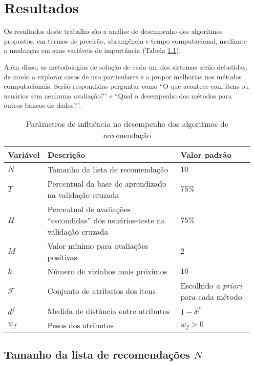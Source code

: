 \chapter[Resultados]{Resultados}
\label{chap:resultados}

Os resultados deste trabalho são a análise de desempenho dos algoritmos propostos, em termos de precisão, abrangência e tempo computacional, mediante a mudanças em suas variáveis de importância (Tabela \ref{tab:variaveis}). 

Além disso, as metodologias de solução de cada um dos sistemas serão debatidas, de modo a explorar casos de uso particulares e a propor melhorias nos métodos computacionais. Serão respondidas perguntas como ``O que acontece com itens ou usuários sem nenhuma avaliação?'' e ``Qual o desempenho dos métodos para outros bancos de dados?''.

\begin{table}[hp]
\begin{center}
    \caption{Parâmetros de influência no desempenho dos algoritmos de recomendação}
    \label{tab:variaveis}
    \begin{tabular}{  | p{2cm} | p{7cm} | p{3.5cm} | } 
    \hline
    \textbf{Variável} & \textbf{Descrição} & \textbf{Valor padrão}  \\ \hline
    $N$ & Tamanho da lista de recomendação & $10$ \\ \hline   
    $T$ & Percentual da base de aprendizado na validação cruzada & $75\%$ \\ \hline
    $H$ & Percentual de avaliações ``escondidas'' dos usuários-teste na validação cruzada & $75\%$ \\ \hline
    $M$ & Valor mínimo para avaliações positivas & $2$ \\ \hline
    $k$ & Número de vizinhos mais próximos & $10$ \\ \hline
    $\mathcal{F}$ & Conjunto de atributos dos itens & Escolhido \textit{a priori} para cada método \\ \hline
    $d^f$ & Medida de distância entre atributos & $1 - \delta^f$ \\ \hline
    $w_f$ & Pesos dos atributos & $w_f>0$ \\ \hline
    \end{tabular}
\end{center}
\end{table}

\section{Tamanho da lista de recomendações $N$} %
\label{sec:tamanho_da_lista_de_recomenda_es_}

